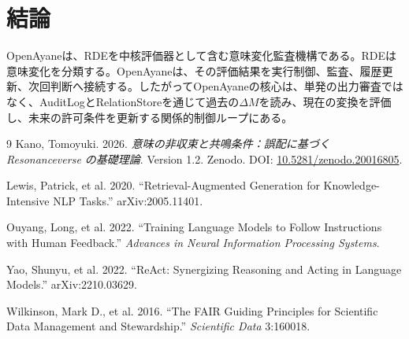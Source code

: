 \documentclass[11pt,a4paper]{article}
\begin{document}
\section{結論}
OpenAyaneは、RDEを中核評価器として含む意味変化監査機構である。RDEは意味変化を分類する。OpenAyaneは、その評価結果を実行制御、監査、履歴更新、次回判断へ接続する。したがってOpenAyaneの核心は、単発の出力審査ではなく、AuditLogとRelationStoreを通じて過去の$\Delta M$を読み、現在の変換を評価し、未来の許可条件を更新する関係的制御ループにある。

\begin{thebibliography}{9}
Kano, Tomoyuki. 2026. \textit{意味の非収束と共鳴条件：誤配に基づく Resonanceverse の基礎理論}. Version 1.2. Zenodo. DOI: \href{https://doi.org/10.5281/zenodo.20016805}{10.5281/zenodo.20016805}.

Lewis, Patrick, et al. 2020. ``Retrieval-Augmented Generation for Knowledge-Intensive NLP Tasks.'' arXiv:2005.11401.

Ouyang, Long, et al. 2022. ``Training Language Models to Follow Instructions with Human Feedback.'' \textit{Advances in Neural Information Processing Systems}.

Yao, Shunyu, et al. 2022. ``ReAct: Synergizing Reasoning and Acting in Language Models.'' arXiv:2210.03629.

Wilkinson, Mark D., et al. 2016. ``The FAIR Guiding Principles for Scientific Data Management and Stewardship.'' \textit{Scientific Data} 3:160018.
\end{thebibliography}
\end{document}
